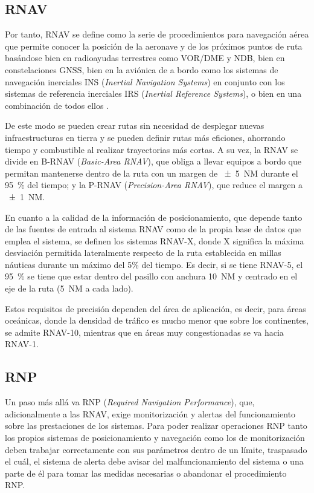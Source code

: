 \pagebreak

\subsection{RNAV}
\label{subsec:RNAV}

Por tanto, RNAV se define como la serie de procedimientos para navegación aérea que permite conocer la posición de la aeronave y de los próximos puntos de ruta basándose bien en radioayudas terrestres como VOR/DME y NDB, bien en constelaciones GNSS, bien en la aviónica de a bordo como los sistemas de navegación inerciales INS (\textit{Inertial Navigation Systems}) en conjunto con los sistemas de referencia inerciales IRS (\textit{Inertial Reference Systems}), o bien en una combinación de todos ellos \cite{PBN_AESA}. 


De este modo se pueden crear rutas sin necesidad de desplegar nuevas infraestructuras en tierra y se pueden definir rutas más eficiones, ahorrando tiempo y combustible al realizar trayectorias más cortas. A su vez, la RNAV se divide en B-RNAV (\textit{Basic-Area RNAV}), que obliga a llevar equipos a bordo que permitan mantenerse dentro de la ruta con un margen de \SI{\pm5}{NM} durante el \SI{95}{\percent} del tiempo; y la P-RNAV (\textit{Precision-Area RNAV}), que reduce el margen a \SI{\pm1}{NM}.


En cuanto a la calidad de la información de posicionamiento, que depende tanto de las fuentes de entrada al sistema RNAV como de la propia base de datos que emplea el sistema, se definen los sistemas RNAV-X, donde X significa la máxima desviación permitida lateralmente respecto de la ruta establecida en millas náuticas durante un máximo del 5\% del tiempo. Es decir, si se tiene RNAV-5, el \SI{95}{\percent} se tiene que estar dentro del pasillo con anchura \SI{10}{NM} y centrado en el eje de la ruta (\SI{5}{NM} a cada lado).

Estos requisitos de precisión dependen del área de aplicación, es decir, para áreas oceánicas, donde la densidad de tráfico es mucho menor que sobre los continentes, se admite RNAV-10, mientras que en áreas muy congestionadas se va hacia RNAV-1.

\subsection{RNP}
\label{subsec:RNP}

Un paso más allá va RNP (\textit{Required Navigation Performance}), que, adicionalmente a las RNAV, exige monitorización y alertas del funcionamiento sobre las prestaciones de los sistemas. Para poder realizar operaciones RNP tanto los propios sistemas de posicionamiento y navegación como los de monitorización deben trabajar correctamente con sus parámetros dentro de un límite, traspasado el cuál, el sistema de alerta debe avisar del malfuncionamiento del sistema o una parte de él para tomar las medidas necesarias o abandonar el procedimiento RNP.

